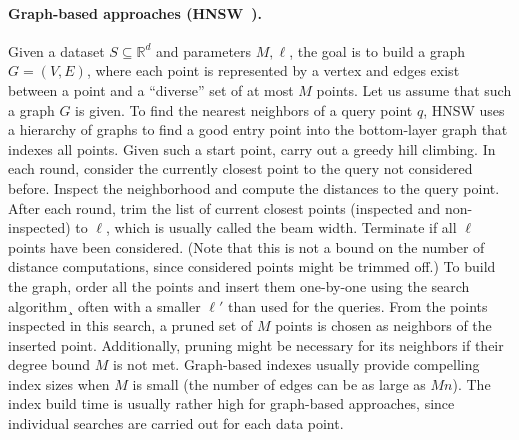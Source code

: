 \documentclass[11pt]{article}
\begin{document}
\paragraph{Graph-based approaches
	(HNSW~\cite{DBLP:journals/pami/MalkovY20}).} Given a dataset $S \subseteq
	\mathbb{R}^d$ and parameters $M, \ell$, the goal is to build a graph $G =
	(V, E)$, where each point is represented by a vertex and edges exist
between a point and a ``diverse'' set of at most $M$ points. Let us
assume that such a graph $G$ is given. To find the nearest neighbors of a
query point $q$, HNSW uses a hierarchy of graphs to find a good entry point
into the bottom-layer graph that indexes all points. Given such a start
point, carry out a greedy hill climbing. In each round, consider the
currently closest point to the query not considered before. Inspect the
neighborhood and compute the distances to the query point. After each
round, trim the list of current closest points (inspected and
non-inspected) to $\ell$, which is usually called the beam width. Terminate
if all $\ell$ points have been considered. (Note that this is not a bound
on the number of distance computations, since considered points might be
trimmed off.) To build the graph, order all the points and insert them
one-by-one using the search algorithm¸ often with a smaller $\ell'$ than
used for the queries. From the points inspected in this search, a pruned
set of $M$ points is chosen as neighbors of the inserted point. Additionally, pruning
might be necessary for its neighbors if their degree bound $M$ is not met.
Graph-based indexes usually provide compelling index sizes when $M$ is small (the number of edges can be as large as $Mn$).
The index build time is usually rather high for graph-based approaches, since individual searches are carried out for each data point.
\end{document}
